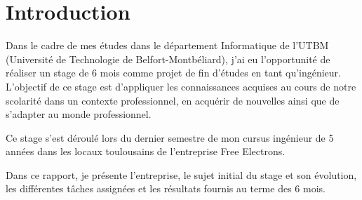 \chapter*{Introduction}

Dans le cadre de mes études dans le département Informatique de l'UTBM (Université de Technologie de Belfort-Montbéliard), j'ai eu l'opportunité de réaliser un stage de 6 mois comme projet de fin d'études en tant qu'ingénieur. L'objectif de ce stage est d'appliquer les connaissances acquises au cours de notre scolarité dans un contexte professionnel, en acquérir de nouvelles ainsi que de s'adapter au monde professionnel.

Ce stage s'est déroulé lors du dernier semestre de mon cursus ingénieur de 5 années dans les locaux toulousains de l'entreprise Free Electrons.

Dans ce rapport, je présente l'entreprise, le sujet initial du stage et son évolution, les différentes tâches assignées et les résultats fournis au terme des 6 mois.
